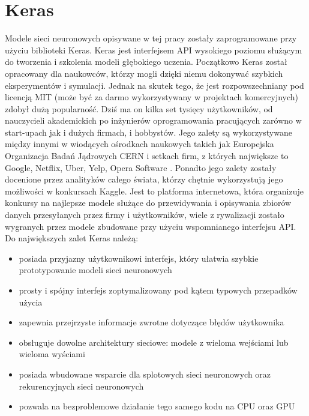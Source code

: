 \documentclass[11pt]{book}
\theoremstyle{definition}
\begin{document}
\section{Keras}
Modele sieci neuronowych opisywane w tej pracy zostały zaprogramowane przy użyciu biblioteki Keras. Keras jest interfejsem API wysokiego poziomu służącym do tworzenia i szkolenia modeli głębokiego uczenia. Początkowo Keras został opracowany dla naukowców, którzy mogli dzięki niemu dokonywać szybkich eksperymentów i symulacji. Jednak na skutek tego, że jest rozpowszechniany pod licencją MIT (może być za darmo wykorzystywany w projektach komercyjnych) zdobył dużą popularność. Dziś ma on kilka set tysięcy użytkowników, od nauczycieli akademickich po inżynierów oprogramowania pracujących zarówno w start-upach jak i dużych firmach, i hobbystów. Jego zalety są wykorzystywane między innymi w wiodących ośrodkach naukowych takich jak Europejska Organizacja Badań Jądrowych CERN i setkach firm, z których największe to Google, Netflix, Uber, Yelp, Opera Software \cite{Chollet:2017}. Ponadto jego zalety zostały docenione przez analityków całego świata, którzy chętnie wykorzystują jego możliwości w konkursach Kaggle. Jest to platforma internetowa, która organizuje konkursy na najlepsze modele służące do przewidywania i opisywania zbiorów danych przesyłanych przez firmy i użytkowników, wiele z rywalizacji zostało wygranych przez modele zbudowane przy użyciu wspomnianego interfejsu API.
%
Do największych zalet Keras należą:
\begin{itemize}
	\setlength\itemsep{0.em}
	
	\item  posiada przyjazny użytkownikowi interfejs, który ułatwia szybkie prototypowanie modeli sieci neuronowych
	\item  prosty i spójny interfejs zoptymalizowany pod kątem typowych przepadków użycia
	\item  zapewnia przejrzyste informacje zwrotne dotyczące błędów użytkownika
	\item  obsługuje dowolne architektury sieciowe: modele z wieloma wejściami lub wieloma wyściami
	\item posiada wbudowane wsparcie dla splotowych sieci neuronowych oraz rekurencyjnych sieci neuronowych
	\item  pozwala na bezproblemowe działanie tego samego kodu na CPU oraz GPU
\end{itemize}
%
\end{document}
